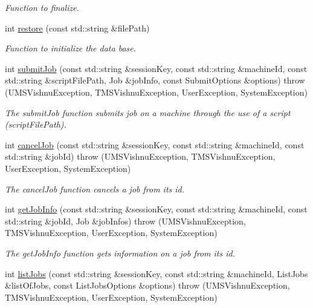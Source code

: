 \begin{DoxyCompactItemize}
\begin{DoxyCompactList}\small\item\em Function to finalize. \item\end{DoxyCompactList}\item 
int \hyperlink{namespacevishnu_ab1b9efc3bdb39619f591a2eaa96baac9}{restore} (const std::string \&filePath)
\begin{DoxyCompactList}\small\item\em Function to initialize the data base. \item\end{DoxyCompactList}\item 
int \hyperlink{namespacevishnu_adfcc1f58eb5f9294cd3e668704e62649}{submitJob} (const std::string \&sessionKey, const std::string \&machineId, const std::string \&scriptFilePath, Job \&jobInfo, const SubmitOptions \&options)  throw (UMSVishnuException, TMSVishnuException, UserException, SystemException)
\begin{DoxyCompactList}\small\item\em The submitJob function submits job on a machine through the use of a script (scriptFilePath). \item\end{DoxyCompactList}\item 
int \hyperlink{namespacevishnu_a151ba595af88d89107ff08ad0e2c5e31}{cancelJob} (const std::string \&sessionKey, const std::string \&machineId, const std::string \&jobId)  throw (UMSVishnuException, TMSVishnuException, UserException, SystemException)
\begin{DoxyCompactList}\small\item\em The cancelJob function cancels a job from its id. \item\end{DoxyCompactList}\item 
int \hyperlink{namespacevishnu_a4461c3e9d86e9c507436655056a1b660}{getJobInfo} (const std::string \&sessionKey, const std::string \&machineId, const std::string \&jobId, Job \&jobInfos)  throw (UMSVishnuException, TMSVishnuException, UserException, SystemException)
\begin{DoxyCompactList}\small\item\em The getJobInfo function gets information on a job from its id. \item\end{DoxyCompactList}\item 
int \hyperlink{namespacevishnu_a6244690b88aff21355c382318bffff14}{listJobs} (const std::string \&sessionKey, const std::string \&machineId, ListJobs \&listOfJobs, const ListJobsOptions \&options)  throw (UMSVishnuException, TMSVishnuException, UserException, SystemException)

\end{DoxyCompactItemize}
